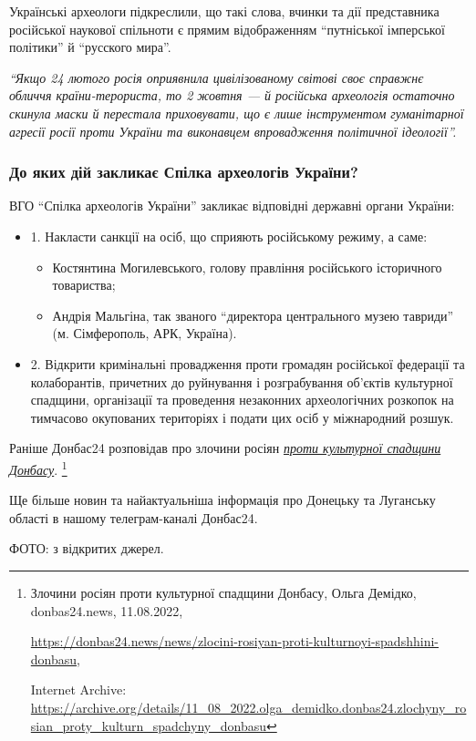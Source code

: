 Українські археологи підкреслили, що такі слова, вчинки та дії представника
російської наукової спільноти є прямим відображенням \enquote{путніської імперської
політики} й \enquote{русского мира}.



\begin{leftbar}
\em\enquote{Якщо 24 лютого росія оприявнила цивілізованому світові своє справжнє обличчя
країни-терориста, то 2 жовтня — й російська археологія остаточно скинула маски
й перестала приховувати, що є лише інструментом гуманітарної агресії росії
проти України та виконавцем впровадження політичної ідеології}.
\end{leftbar}

\subsubsection{До яких дій закликає Спілка археологів України?}

ВГО \enquote{Спілка археологів України} закликає відповідні державні органи України:

\begin{itemize} %
\item 1. Накласти санкції на осіб, що сприяють російському режиму, а саме:

\begin{itemize} %
\item Костянтина Могилевського, голову правління російського історичного товариства;
\item Андрія Мальгіна, так званого \enquote{директора центрального музею тавриди} (м. Сімферополь, АРК, Україна).
\end{itemize} %

\item 2. Відкрити кримінальні провадження проти громадян російської федерації та
колаборантів, причетних до руйнування і розграбування об'єктів культурної
спадщини, організації та проведення незаконних археологічних розкопок на
тимчасово окупованих територіях і подати цих осіб у міжнародний розшук.
\end{itemize} %

Раніше Донбас24 розповідав про злочини росіян \href{https://archive.org/details/11_08_2022.olga_demidko.donbas24.zlochyny_rosian_proty_kulturn_spadchyny_donbasu}{\emph{проти культурної спадщини Донбасу}}.%
\footnote{Злочини росіян проти культурної спадщини Донбасу, Ольга Демідко, donbas24.news, 11.08.2022, \par%
\url{https://donbas24.news/news/zlocini-rosiyan-proti-kulturnoyi-spadshhini-donbasu}, \par%
Internet Archive: \url{https://archive.org/details/11_08_2022.olga_demidko.donbas24.zlochyny_rosian_proty_kulturn_spadchyny_donbasu}%
}

Ще більше новин та найактуальніша інформація про Донецьку та Луганську області
в нашому телеграм-каналі Донбас24.

ФОТО: з відкритих джерел.

